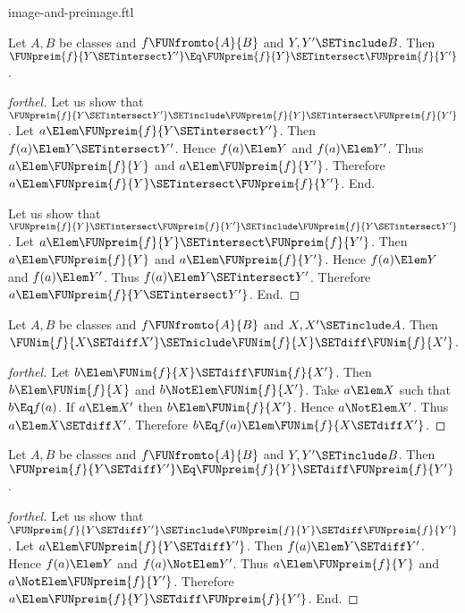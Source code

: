 \documentclass{stex}
\begin{document}
\begin{smodule}{image-and-preimage.ftl}
\begin{proposition}[forthel,id=FOUNDATIONS_07_4021844428455936]
  Let $A, B$ be classes and $f \FUNfromto{A}{B}$ and $Y, Y' \SETinclude B$.
  Then $\FUNpreim{f}{Y \SETintersect Y'} \Eq \FUNpreim{f}{Y} \SETintersect \FUNpreim{f}{Y'}$.
\end{proposition}
\begin{proof}[forthel]
  Let us show that $\FUNpreim{f}{Y \SETintersect Y'} \SETinclude \FUNpreim{f}{Y} \SETintersect \FUNpreim{f}{Y'}$.
    Let $a \Elem \FUNpreim{f}{Y \SETintersect Y'}$.
    Then $f(a) \Elem Y \SETintersect Y'$.
    Hence $f(a) \Elem Y$ and $f(a) \Elem Y'$.
    Thus $a \Elem \FUNpreim{f}{Y}$ and $a \Elem \FUNpreim{f}{Y'}$.
    Therefore $a \Elem \FUNpreim{f}{Y} \SETintersect \FUNpreim{f}{Y'}$.
  End.

  Let us show that $\FUNpreim{f}{Y} \SETintersect \FUNpreim{f}{Y'} \SETinclude \FUNpreim{f}{Y \SETintersect Y'}$.
    Let $a \Elem \FUNpreim{f}{Y} \SETintersect \FUNpreim{f}{Y'}$.
    Then $a \Elem \FUNpreim{f}{Y}$ and $a \Elem \FUNpreim{f}{Y'}$.
    Hence $f(a) \Elem Y$ and $f(a) \Elem Y'$.
    Thus $f(a) \Elem Y \SETintersect Y'$.
    Therefore $a \Elem \FUNpreim{f}{Y \SETintersect Y'}$.
  End.
\end{proof}

\begin{proposition}[forthel,id=FOUNDATIONS_07_8372256617005056]
  Let $A, B$ be classes and $f \FUNfromto{A}{B}$ and $X, X' \SETinclude A$.
  Then $\FUNim{f}{X \SETdiff X'} \SETniclude \FUNim{f}{X} \SETdiff \FUNim{f}{X'}$.
\end{proposition}
\begin{proof}[forthel]
  Let $b \Elem \FUNim{f}{X} \SETdiff \FUNim{f}{X'}$.
  Then $b \Elem \FUNim{f}{X}$ and $b \NotElem \FUNim{f}{X'}$.
  Take $a \Elem X$ such that $b \Eq f(a)$.
  If $a \Elem X'$ then $b \Elem \FUNim{f}{X'}$.
  Hence $a \NotElem X'$.
  Thus $a \Elem X \SETdiff X'$.
  Therefore $b \Eq f(a) \Elem \FUNim{f}{X \SETdiff X'}$.
\end{proof}

\begin{proposition}[forthel,id=FOUNDATIONS_07_6552168641331200]
  Let $A, B$ be classes and $f \FUNfromto{A}{B}$ and $Y, Y' \SETinclude B$.
  Then $\FUNpreim{f}{Y \SETdiff Y'} \Eq \FUNpreim{f}{Y} \SETdiff \FUNpreim{f}{Y'}$.
\end{proposition}
\begin{proof}[forthel]
  Let us show that $\FUNpreim{f}{Y \SETdiff Y'} \SETinclude \FUNpreim{f}{Y} \SETdiff \FUNpreim{f}{Y'}$.
    Let $a \Elem \FUNpreim{f}{Y \SETdiff Y'}$.
    Then $f(a) \Elem Y \SETdiff Y'$.
    Hence $f(a) \Elem Y$ and $f(a) \NotElem Y'$.
    Thus $a \Elem \FUNpreim{f}{Y}$ and $a \NotElem \FUNpreim{f}{Y'}$.
    Therefore $a \Elem \FUNpreim{f}{Y} \SETdiff \FUNpreim{f}{Y'}$.
  End.


\end{proof}
\end{smodule}
\end{document}

